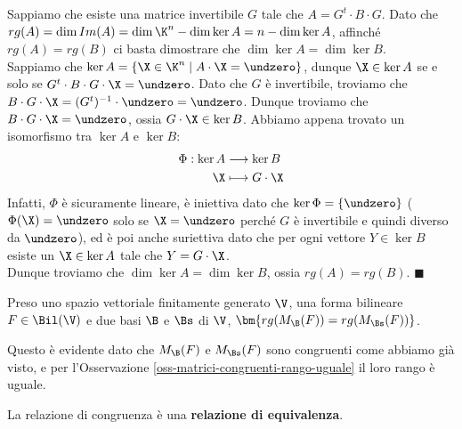 \documentclass[11pt, a4paper, titlepage, oneside]{scrbook}
\begin{document}
\Dimostrazione \nopagebreak

Sappiamo che esiste una matrice invertibile $G$ tale che $A = G^t \cdot B \cdot G$. Dato che \mbox{$rg(A) = \dim Im(A) = \dim \K^n - \dim \ker A = n - \dim \ker A$}, affinché $rg(A) = rg(B)$ ci basta dimostrare che $\dim \ker A = \dim \ker B$. \\
Sappiamo che $\ker A = \{\X \in \K^n \mid A \cdot \X = \undzero\}$, dunque $\X \in \ker A$ se e solo se $G^t \cdot B \cdot G \cdot \X = \undzero$. Dato che $G$ è invertibile, troviamo che $B \cdot G \cdot \X = (G^t)^{-1} \cdot \undzero = \undzero$. Dunque troviamo che $B \cdot G \cdot \X = \undzero$, ossia $G \cdot \X \in \ker B$. Abbiamo appena trovato un isomorfismo tra $\ker A$ e $\ker B$:
\begin{align*}
\Phi: \ker A &\longrightarrow \ker B \\
\X &\longmapsto G \cdot \X 
\end{align*}
Infatti, $\Phi$ è sicuramente lineare, è iniettiva dato che $\ker \Phi = \{\undzero\}$ ($\Phi(\X) = \undzero$ solo se $\X = \undzero$ perché $G$ è invertibile e quindi diverso da $\undzero$), ed è poi anche suriettiva dato che per ogni vettore $Y \in \ker B$ esiste un $\X \in \ker A$ tale che $Y = G \cdot \X$. \\
Dunque troviamo che $\dim \ker A = \dim \ker B$, ossia $rg(A) = rg(B)$. $\blacksquare$

\begin{Proposizione}[Corollario]
\label{corol-forme-equivalenti}
Preso uno spazio vettoriale finitamente generato $\V$, una forma bilineare $F \in \Bil(\V)$ e due basi $\B$ e $\Bs$ di $\V$, $\bm{rg(M_\B(F)) = rg(M_\Bs(F))}$.
\end{Proposizione}

Questo è evidente dato che $M_\B(F)$ e $M_\Bs(F)$ sono congruenti come abbiamo già visto, e per l'Osservazione \ref{oss-matrici-congruenti-rango-uguale} il loro rango è uguale.


\begin{Osservazione}[]
\label{oss-relazione-congruenza-equivalenz}
La relazione di congruenza è una \textbf{relazione di equivalenza}.
\end{Osservazione}

\Dimostrazione \nopagebreak
\end{document}
